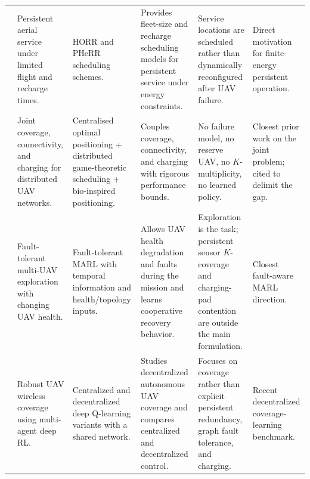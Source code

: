 \documentclass[conference]{IEEEtran}
\begin{document}
\begin{table}[t]
\begin{tabularx}{\textwidth}{@{}L{0.5cm}L{2.5cm}L{1.9cm}L{4.6cm}L{4.0cm}Y@{}}
\cite{arribas2023} & Persistent aerial service under limited flight and recharge times. & HORR and PHeRR scheduling schemes. & Provides fleet-size and recharge scheduling models for persistent service under energy constraints. & Service locations are scheduled rather than dynamically reconfigured after UAV failure. & Direct motivation for finite-energy persistent operation. \\
\cite{trotta2018} & Joint coverage, connectivity, and charging for distributed UAV networks. & Centralised optimal positioning + distributed game-theoretic scheduling + bio-inspired positioning. & Couples coverage, connectivity, and charging with rigorous performance bounds. & No failure model, no reserve UAV, no $K$-multiplicity, no learned policy. & Closest prior work on the joint problem; cited to delimit the gap. \\
\cite{jiang2024} & Fault-tolerant multi-UAV exploration with changing UAV health. & Fault-tolerant MARL with temporal information and health/topology inputs. & Allows UAV health degradation and faults during the mission and learns cooperative recovery behavior. & Exploration is the task; persistent sensor $K$-coverage and charging-pad contention are outside the main formulation. & Closest fault-aware MARL direction. \\
\cite{khan2025} & Robust UAV wireless coverage using multi-agent deep RL. & Centralized and decentralized deep Q-learning variants with a shared network. & Studies decentralized autonomous UAV coverage and compares centralized and decentralized control. & Focuses on coverage rather than explicit persistent redundancy, graph fault tolerance, and charging. & Recent decentralized coverage-learning benchmark. \\
\bottomrule
\end{tabularx}
\end{table}
\end{document}
